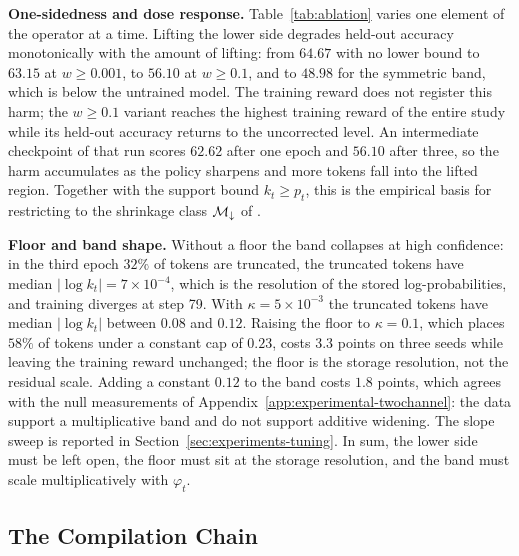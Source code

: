 \noindent\textbf{One-sidedness and dose response.}
Table~\ref{tab:ablation} varies one element of the operator at a time. Lifting the lower side degrades held-out accuracy monotonically with the amount of lifting: from $64.67$ with no lower bound to $63.15$ at $w\ge0.001$, to $56.10$ at $w\ge0.1$, and to $48.98$ for the symmetric band, which is below the untrained model. The training reward does not register this harm; the $w\ge0.1$ variant reaches the highest training reward of the entire study while its held-out accuracy returns to the uncorrected level. An intermediate checkpoint of that run scores $62.62$ after one epoch and $56.10$ after three, so the harm accumulates as the policy sharpens and more tokens fall into the lifted region. Together with the support bound $k_t\ge p_t$, this is the empirical basis for restricting to the shrinkage class $\mathcal{M}_{\downarrow}$ of .

\noindent\textbf{Floor and band shape.}
Without a floor the band collapses at high confidence: in the third epoch $32\%$ of tokens are truncated, the truncated tokens have median $|\log k_t|=7\times10^{-4}$, which is the resolution of the stored log-probabilities, and training diverges at step 79. With $\kappa=5\times10^{-3}$ the truncated tokens have median $|\log k_t|$ between $0.08$ and $0.12$. Raising the floor to $\kappa=0.1$, which places $58\%$ of tokens under a constant cap of $0.23$, costs $3.3$ points on three seeds while leaving the training reward unchanged; the floor is the storage resolution, not the residual scale. Adding a constant $0.12$ to the band costs $1.8$ points, which agrees with the null measurements of Appendix~\ref{app:experimental-twochannel}: the data support a multiplicative band and do not support additive widening. The slope sweep is reported in Section~\ref{sec:experiments-tuning}. In sum, the lower side must be left open, the floor must sit at the storage resolution, and the band must scale multiplicatively with $\varphi_t$.

\subsection{The Compilation Chain}
\label{app:experimental-compile}

